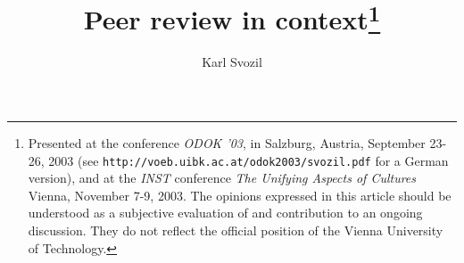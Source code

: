 \documentclass[pra,showpacs,showkeys,amsfonts,12pt]{revtex4}
\usepackage{graphicx}
\RequirePackage{times}
\RequirePackage{mathptm}
\RequirePackage{textcomp}
\RequirePackage[german]{babel}
\RequirePackage[isolatin]{inputenc}

\title{Peer review in context\footnote{
Presented at the conference
{\em ODOK '03}, in Salzburg, Austria, September 23-26, 2003
(see {\tt http://voeb.uibk.ac.at/odok2003/svozil.pdf} for a German version),
and at the
{\em INST} conference {\em The Unifying Aspects of Cultures}
Vienna, November 7-9, 2003.
The opinions expressed in this article
should be understood as a subjective evaluation of and contribution to an
ongoing discussion. They
do not reflect the official position of the Vienna University of Technology. }}
\author{Karl Svozil}


\begin{abstract}
Scientific publishing is in a transition between the
old paper-bound, static forms and the new electronic media with its
interactive, dynamic possibilities.  This takes place in the context of
imploding library budgets and exploding magazine costs.  The scientists
as authors, reviewers and editors of scientific journals are exposed to an
increased pressure by the their administrations and the public
towards quantification, objectification and certification of scientific
achievements.  The ``publication roulette'' resulting from
low-quality editorial procedures often amounts to malign
censorship, which not only is experienced as a frustration by the authors,
but is also delaying and hampering the progress of science.
It also leads to a
waste of funds under the cover of pseudo-objectivity and pseudo-legitimacy of financial decisions.
Different solutions are outlined
and discussed.  As concerns scientific publishing, an e-print service
should be established, which, in continuation of existing e-servers such
as {\it arxiv.org}, is operated either directly by the United Nations Educational, Scientific and Cultural
Organization, or by an international consortium.  In order to become generally accepted by
the scientists, certification criteria must be provided, which would
make it possible to successfully pursue a scientific career besides the
traditional peer reviewed print publications.
\end{abstract}

